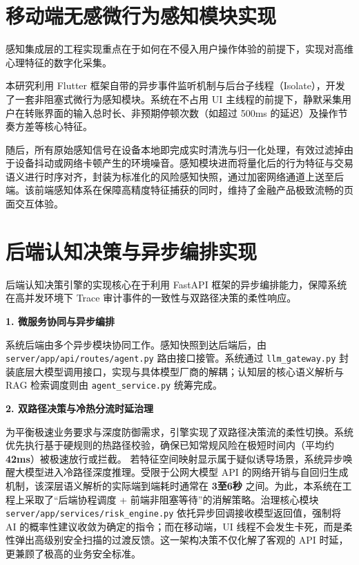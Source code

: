 \documentclass[twoside,openright]{xduugthesis}
\begin{document}
\section{移动端无感微行为感知模块实现}

感知集成层的工程实现重点在于如何在不侵入用户操作体验的前提下，实现对高维心理特征的数字化采集\cite{li2024cognitive}。

本研究利用 Flutter 框架自带的异步事件监听机制与后台子线程（Isolate），开发了一套非阻塞式微行为感知模块。系统在不占用 UI 主线程的前提下，静默采集用户在转账界面的输入总时长、非预期停顿次数（如超过 500ms 的延迟）及操作节奏方差等核心特征。

随后，所有原始感知信号在设备本地即完成实时清洗与归一化处理，有效过滤掉由于设备抖动或网络卡顿产生的环境噪音。感知模块进而将量化后的行为特征与交易语义进行时序对齐，封装为标准化的风险感知快照，通过加密网络通道上送至后端。该前端感知体系在保障高精度特征捕获的同时，维持了金融产品极致流畅的页面交互体验。

\section{后端认知决策与异步编排实现}

后端认知决策引擎的实现核心在于利用 FastAPI 框架的异步编排能力，保障系统在高并发环境下 Trace 审计事件的一致性与双路径决策的柔性响应。

\textbf{1. 微服务协同与异步编排}

系统后端由多个异步模块协同工作。感知快照到达后端后，由 \texttt{server/app/api/routes/agent.py} 路由接口接管。系统通过 \texttt{llm\_gateway.py} 封装底层大模型调用接口，实现与具体模型厂商的解耦；认知层的核心语义解析与 RAG 检索调度则由 \texttt{agent\_service.py} 统筹完成。

\textbf{2. 双路径决策与冷热分流时延治理}

为平衡极速业务要求与深度防御需求，引擎实现了双路径决策流的柔性切换。系统优先执行基于硬规则的热路径校验，确保已知常规风险在极短时间内（平均约 \textbf{42ms}）被极速放行或拦截。
若特征空间映射显示属于疑似诱导场景，系统异步唤醒大模型进入冷路径深度推理。受限于公网大模型 API 的网络开销与自回归生成机制，该深层语义解析的实际端到端耗时通常在 \textbf{3至6秒} 之间。为此，本系统在工程上采取了“后端协程调度 + 前端非阻塞等待”的消解策略。治理核心模块 \texttt{server/app/services/risk\_engine.py} 依托异步回调接收模型返回值，强制将 AI 的概率性建议收敛为确定的指令；而在移动端，UI 线程不会发生卡死，而是柔性弹出高级别安全扫描的过渡反馈。这一架构决策不仅化解了客观的 API 时延，更兼顾了极高的业务安全标准。
\end{document}
